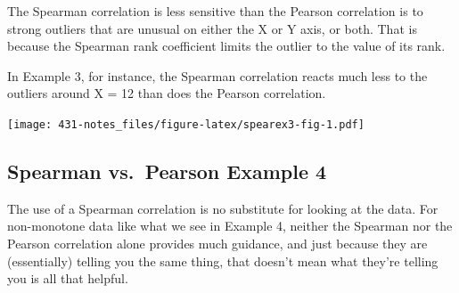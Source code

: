 \documentclass[
]{book}
\newenvironment{Shaded}{\begin{snugshade}}{\end{snugshade}}
\newcommand{\DataTypeTok}[1]{\textcolor[rgb]{0.13,0.29,0.53}{#1}}
\newcommand{\DecValTok}[1]{\textcolor[rgb]{0.00,0.00,0.81}{#1}}
\newcommand{\KeywordTok}[1]{\textcolor[rgb]{0.13,0.29,0.53}{\textbf{#1}}}
\newcommand{\NormalTok}[1]{#1}
\newcommand{\OperatorTok}[1]{\textcolor[rgb]{0.81,0.36,0.00}{\textbf{#1}}}
\newcommand{\StringTok}[1]{\textcolor[rgb]{0.31,0.60,0.02}{#1}}
\begin{document}
The Spearman correlation is less sensitive than the Pearson correlation is to strong outliers that are unusual on either the X or Y axis, or both. That is because the Spearman rank coefficient limits the outlier to the value of its rank.

In Example 3, for instance, the Spearman correlation reacts much less to the outliers around X = 12 than does the Pearson correlation.

\begin{Shaded}
\end{Shaded}

\texttt{[image: 431-notes\_files/figure-latex/spearex3-fig-1.pdf]}

\hypertarget{spearman-vs.-pearson-example-4}{%
\subsection{Spearman vs.~Pearson Example 4}\label{spearman-vs.-pearson-example-4}}

The use of a Spearman correlation is no substitute for looking at the data. For non-monotone data like what we see in Example 4, neither the Spearman nor the Pearson correlation alone provides much guidance, and just because they are (essentially) telling you the same thing, that doesn't mean what they're telling you is all that helpful.
\end{document}
